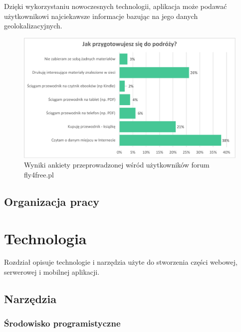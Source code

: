 \documentclass[a4paper]{book}
\begin{document}
			Dzięki wykorzystaniu nowoczesnych technologii, aplikacja może podawać użytkownikowi najciekawsze informacje bazując na jego danych geolokalizacyjnych.  
			
			\begin{figure}		
				\centering
				\includegraphics[width=1.0\textwidth]{images/fly4freeAnkieta.pdf}
				\caption{Wyniki ankiety przeprowadzonej wśród użytkowników forum fly4free.pl}
				\label{fig:fly4freeAnkieta}
			\end{figure}
		
			\section{Organizacja pracy}
		
	
	
	
	\chapter{Technologia}
	\label{id:cha:technologia}
	
	Rozdział opisuje technologie i narzędzia użyte do stworzenia części webowej, serwerowej i mobilnej aplikacji.
	
		\section{Narzędzia}		
			\subsection{Środowisko programistyczne}
				
\end{document}
